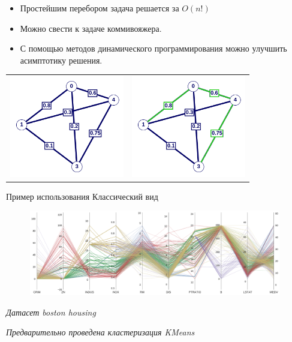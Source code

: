 \documentclass[fleqn, xcolor=x11names]{beamer}
\begin{document}
\begin{frame}{}

    \begin{itemize}
        \item Простейшим перебором задача решается за $O(n!)$
        \item Можно свести к задаче коммивояжера.
        \item С помощью методов динамического программирования можно улучшить асимптотику решения.
    \end{itemize}

    \vspace{10px}

    \begin{tabular}{cc}
        \centering
        \includegraphics[width=5cm]{graph_example_1.png} &
        \includegraphics[width=5cm]{graph_example_2.png}   \\
    \end{tabular}
\end{frame}

\begin{frame}{Пример использования}
    Классический вид

    \begin{figure}[htb]
        \centering
        \includegraphics[width=11cm]{housing_example_1.pdf}
    \end{figure}

    \textit{Датасет boston housing}
    
    \textit{Предварительно проведена кластеризация KMeans}
\end{frame}
\end{document}
